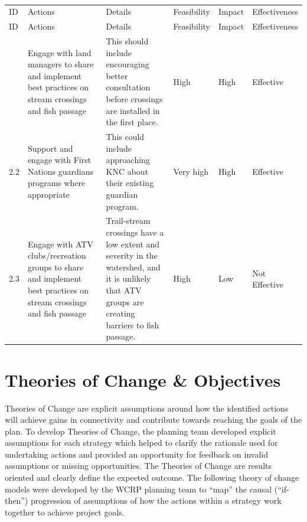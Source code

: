 \documentclass[
  letterpaper,
  DIV=11,
  numbers=noendperiod]{scrreprt}
\begin{document}

\begin{longtable}[]{@{}llllll@{}}

\caption{\label{tbl-S2}Strategy 2}

\tabularnewline

\caption{}\label{T_d6a22}\tabularnewline
\toprule\noalign{}
ID & Actions & Details & Feasibility & Impact & Effectiveness \\
\midrule\noalign{}
\endfirsthead
\toprule\noalign{}
ID & Actions & Details & Feasibility & Impact & Effectiveness \\
\midrule\noalign{}
\endhead
\bottomrule\noalign{}
\endlastfoot
2.1 & Engage with land managers to share and implement best practices on
stream crossings and fish passage & This should include encouraging
better consultation before crossings are installed in the first place. &
High & High & Effective \\
2.2 & Support and engage with First Nations guardians programs where
appropriate & This could include approaching KNC about their existing
guardian program. & Very high & High & Effective \\
2.3 & Engage with ATV clubs/recreation groups to share and implement
best practices on stream crossings and fish passage & Trail-stream
crossings have a low extent and severity in the watershed, and it is
unlikely that ATV groups are creating barriers to fish passage. & High &
Low & Not Effective \\

\end{longtable}

\section*{Theories of Change \&
Objectives}\label{theories-of-change-objectives}


Theories of Change are explicit assumptions around how the identified
actions will achieve gains in connectivity and contribute towards
reaching the goals of the plan. To develop Theories of Change, the
planning team developed explicit assumptions for each strategy which
helped to clarify the rationale used for undertaking actions and
provided an opportunity for feedback on invalid assumptions or missing
opportunities. The Theories of Change are results oriented and clearly
define the expected outcome. The following theory of change models were
developed by the WCRP planning team to ``map'' the causal (``if-then'')
progression of assumptions of how the actions within a strategy work
together to achieve project goals.
\end{document}
